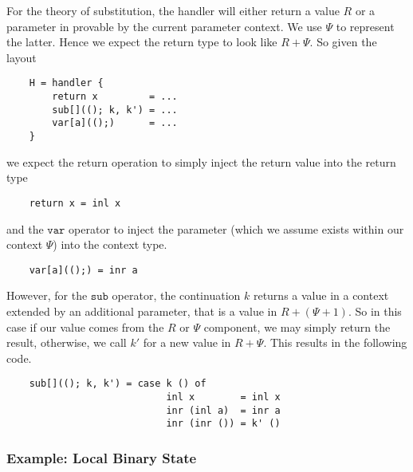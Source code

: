 \documentclass{scrartcl}
\theoremstyle{definition}
\newcommand{\sub}{\mathtt{sub}}
\newcommand{\var}{\mathtt{var}}
\newcommand{\PCtx}{\Psi}
\begin{document}
For the theory of substitution, the handler will either return a value $R$ or a parameter in provable by the current parameter context. We use $\PCtx$ to represent the latter. Hence we expect the return type to look like $R+\PCtx$. So given the layout
\begin{lstlisting}
    H = handler {
        return x         = ...
        sub[]((); k, k') = ...
        var[a](();)      = ...
    }
\end{lstlisting}
we expect the return operation to simply inject the return value into the return type
\begin{lstlisting}
    return x = inl x
\end{lstlisting}
and the $\var$ operator to inject the parameter (which we assume exists within our context $\PCtx$) into the context type.
\begin{lstlisting}
    var[a](();) = inr a
\end{lstlisting}
However, for the $\sub$ operator, the continuation $k$ returns a value in a context extended by an additional parameter, that is a value in $R + (\PCtx + 1)$. So in this case if our value comes from the $R$ or $\PCtx$ component, we may simply return the result, otherwise, we call $k'$ for a new value in $R+\PCtx$. This results in the following code.
\begin{lstlisting}
    sub[]((); k, k') = case k () of
                            inl x        = inl x
                            inr (inl a)  = inr a
                            inr (inr ()) = k' ()
\end{lstlisting}

\subsubsection{Example: Local Binary State}
\end{document}
